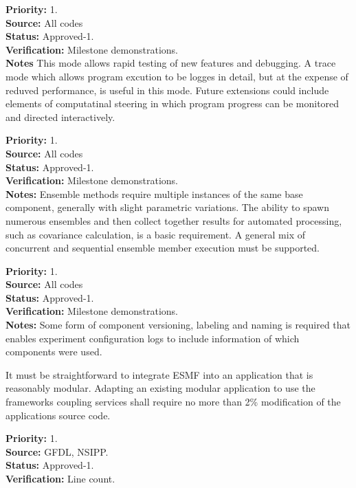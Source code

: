 \begin{reqlist}
{\bf Priority:} 1. \\
{\bf Source:} All codes\\
{\bf Status:} Approved-1. \\
{\bf Verification:} Milestone demonstrations.\\
{\bf Notes} This mode allows rapid testing of new features and debugging.
A trace mode which allows program excution to be logges in detail,
but at the expense of reduved performance, is useful in this mode.
Future extensions could include elements of computatinal steering
in which program progress can be monitored and directed
interactively.
\end{reqlist}

\begin{reqlist}
{\bf Priority:} 1. \\
{\bf Source:} All codes\\
{\bf Status:} Approved-1. \\
{\bf Verification:} Milestone demonstrations.\\
{\bf Notes:} Ensemble methods require multiple instances of
the same base component, generally with slight parametric variations.
The ability to spawn numerous ensembles and then collect together
results for automated processing, such as covariance calculation, 
is a basic requirement. A general mix of concurrent and sequential ensemble 
member execution must be supported.
\end{reqlist}

\begin{reqlist}
{\bf Priority:} 1. \\
{\bf Source:} All codes\\
{\bf Status:} Approved-1. \\
{\bf Verification:} Milestone demonstrations.\\
{\bf Notes:} Some form of component versioning, labeling and naming
is required that enables experiment configuration logs
to include information of which components were used.
\end{reqlist}

It must be straightforward to integrate ESMF into an application 
that is reasonably modular. Adapting an existing modular application
to use the frameworks coupling services shall require no more
than 2\% modification of the applications source code.
\begin{reqlist}
{\bf Priority:} 1. \\
{\bf Source:} GFDL, NSIPP. \\
{\bf Status:} Approved-1. \\
{\bf Verification:} Line count.
\end{reqlist}

